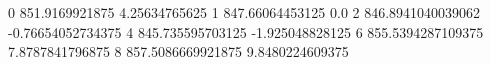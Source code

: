 0 851.9169921875 4.25634765625
1 847.66064453125 0.0
2 846.8941040039062 -0.76654052734375
4 845.735595703125 -1.925048828125
6 855.5394287109375 7.8787841796875
8 857.5086669921875 9.8480224609375
